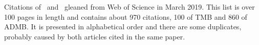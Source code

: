 \documentclass[12pt,letterpaper]{article}
\begin{document}


Citations of~\citet{ADMB0} and~\citet{TMB0} gleaned from Web of
Science in March 2019. This list is over 100 pages in length and
contains about 970 citations, 100 of
TMB and 860 of ADMB. It is presented in alphabetical order and there
are some duplicates, probably caused by both articles cited in the
same paper. 


\nocite{*}


\end{document}
